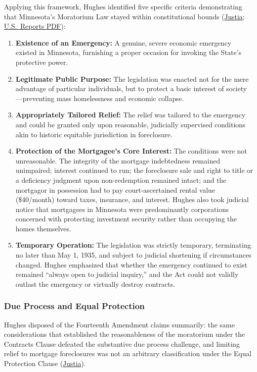 \documentclass[12pt]{article}
\begin{document}
Applying this framework, Hughes identified five specific criteria demonstrating that Minnesota's Moratorium Law stayed within constitutional bounds (\href{https://supreme.justia.com/cases/federal/us/290/398/}{Justia}; \href{https://tile.loc.gov/storage-services/service/ll/usrep/usrep290/usrep290398/usrep290398.pdf}{U.S.\ Reports PDF}):
\begin{enumerate}
  \item \textbf{Existence of an Emergency:} A genuine, severe economic emergency existed in Minnesota, furnishing a proper occasion for invoking the State's protective power.
  \item \textbf{Legitimate Public Purpose:} The legislation was enacted not for the mere advantage of particular individuals, but to protect a basic interest of society---preventing mass homelessness and economic collapse.
  \item \textbf{Appropriately Tailored Relief:} The relief was tailored to the emergency and could be granted only upon reasonable, judicially supervised conditions akin to historic equitable jurisdiction in foreclosure.
  \item \textbf{Protection of the Mortgagee's Core Interest:} The conditions were not unreasonable. The integrity of the mortgage indebtedness remained unimpaired; interest continued to run; the foreclosure sale and right to title or a deficiency judgment upon non-redemption remained intact; and the mortgagor in possession had to pay court-ascertained rental value (\$40/month) toward taxes, insurance, and interest. Hughes also took judicial notice that mortgagees in Minnesota were predominantly corporations concerned with protecting investment security rather than occupying the homes themselves.
  \item \textbf{Temporary Operation:} The legislation was strictly temporary, terminating no later than May 1, 1935, and subject to judicial shortening if circumstances changed. Hughes emphasized that whether the emergency continued to exist remained ``always open to judicial inquiry,'' and the Act could not validly outlast the emergency or virtually destroy contracts.
\end{enumerate}

\subsubsection{Due Process and Equal Protection}

Hughes disposed of the Fourteenth Amendment claims summarily: the same considerations that established the reasonableness of the moratorium under the Contracts Clause defeated the substantive due process challenge, and limiting relief to mortgage foreclosures was not an arbitrary classification under the Equal Protection Clause (\href{https://supreme.justia.com/cases/federal/us/290/398/}{Justia}).
\end{document}
